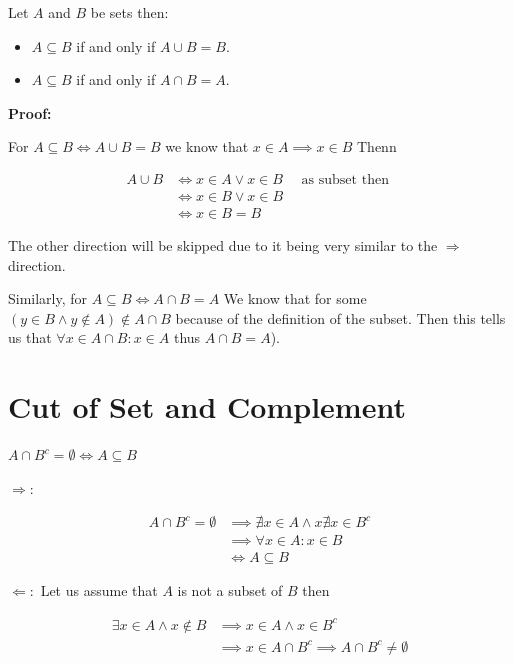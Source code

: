 Let \(A\) and \(B\) be sets then:

\begin{itemize}

	\item \(A \subseteq B\) if and only if \(A \cup B = B\).

	\item \(A \subseteq B\) if and only if \(A \cap B = A\).

\end{itemize}

\textbf{Proof:}

For \(A \subseteq B \iff A \cup B = B\) we know that \(x \in A \implies x \in B \) Thenn

\begin{align*}
	A \cup B & \iff x \in A \lor x \in B \quad \text{ as subset then } \\
	         & \iff x \in B \lor x \in B                               \\
	         & \iff x \in B = B
\end{align*}

The other direction will be skipped due to it being very similar to the \(\Rightarrow\) direction.

Similarly, for \(A \subseteq B \iff A \cap B = A\) We know that for some \((y \in B \land y \notin A) \notin A \cap B\) because of
the definition of the subset. Then this tells us that \(\forall x \in A \cap B: x \in A\) thus \(A \cap B = A\)).

\QED

\section{Cut of Set and Complement}

\(A \cap B^c = \emptyset \iff A \subseteq B\)

\(\Rightarrow\):

\begin{align*}
	A \cap B^c = \emptyset & \implies \nexists x \in A \land x \nexists x \in B^c \\
	                       & \implies \forall x \in A: x \in B                    \\
	                       & \iff A \subseteq B
\end{align*}

\(\Leftarrow:\) Let us assume that \(A\) is not a subset of \(B\) then

\begin{align*}
	\exists x \in A \land x \notin B & \implies x \in A \land x \in B^c                             \\
	                                 & \implies x \in A \cap B^c \implies A \cap B^c \neq \emptyset
\end{align*}

